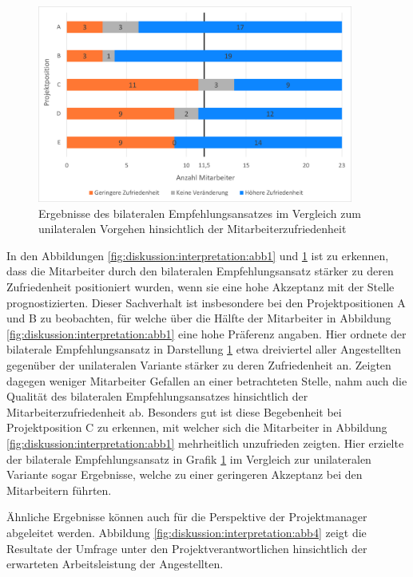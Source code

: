 \begin{figure}[h]
	\centering
	\includegraphics[width=0.925\textwidth]{gfx/zufriedenheit-projekte.png}	
	\caption{Ergebnisse des bilateralen Empfehlungsansatzes im Vergleich zum unilateralen Vorgehen hinsichtlich der Mitarbeiterzufriedenheit}
	\label{fig:diskussion:interpretation:abb3}
\end{figure}

In den Abbildungen \ref{fig:diskussion:interpretation:abb1} und \ref{fig:diskussion:interpretation:abb3} ist zu erkennen, dass die Mitarbeiter durch den bilateralen Empfehlungsansatz stärker zu deren Zufriedenheit positioniert wurden, wenn sie eine hohe Akzeptanz mit der Stelle prognostizierten. Dieser Sachverhalt ist insbesondere bei den Projektpositionen A und B zu beobachten, für welche über die Hälfte der Mitarbeiter in Abbildung \ref{fig:diskussion:interpretation:abb1} eine hohe Präferenz angaben. Hier ordnete der bilaterale Empfehlungsansatz in Darstellung \ref{fig:diskussion:interpretation:abb3} etwa dreiviertel aller Angestellten gegenüber der unilateralen Variante stärker zu deren Zufriedenheit an. Zeigten dagegen weniger Mitarbeiter Gefallen an einer betrachteten Stelle, nahm auch die Qualität des bilateralen Empfehlungsansatzes hinsichtlich der Mitarbeiterzufriedenheit ab. Besonders gut ist diese Begebenheit bei Projektposition C zu erkennen, mit welcher sich die Mitarbeiter in Abbildung \ref{fig:diskussion:interpretation:abb1} mehrheitlich unzufrieden zeigten. Hier erzielte der bilaterale Empfehlungsansatz in Grafik \ref{fig:diskussion:interpretation:abb3} im Vergleich zur unilateralen Variante sogar Ergebnisse, welche zu einer geringeren Akzeptanz bei den Mitarbeitern führten.

Ähnliche Ergebnisse können auch für die Perspektive der Projektmanager abgeleitet werden. Abbildung \ref{fig:diskussion:interpretation:abb4} zeigt die Resultate der Umfrage unter den Projektverantwortlichen hinsichtlich der erwarteten Arbeitsleistung der Angestellten.

